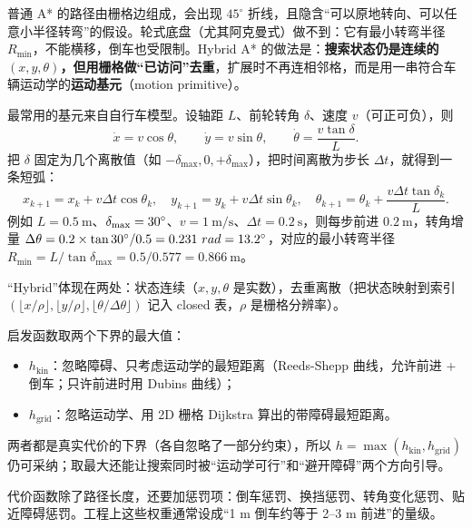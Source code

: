 普通 A* 的路径由栅格边组成，会出现 $45^\circ$ 折线，且隐含“可以原地转向、可以任意小半径转弯”的假设。轮式底盘（尤其阿克曼式）做不到：它有最小转弯半径 $R_{\min}$，不能横移，倒车也受限制。Hybrid A*\cite{dolgov2010hybridastar} 的做法是：\textbf{搜索状态仍是连续的 $(x,y,\theta)$，但用栅格做“已访问”去重}，扩展时不再连相邻格，而是用一串符合车辆运动学的\textbf{运动基元}（motion primitive）。

最常用的基元来自自行车模型。设轴距 $L$、前轮转角 $\delta$、速度 $v$（可正可负），则
\begin{equation}
  \dot x=v\cos\theta,\qquad \dot y=v\sin\theta,\qquad \dot\theta=\frac{v\tan\delta}{L}.
  \label{eq:19-bicycle}
\end{equation}
把 $\delta$ 固定为几个离散值（如 $-\delta_{\max},0,+\delta_{\max}$），把时间离散为步长 $\Delta t$，就得到一条短弧：
\begin{equation}
  x_{k+1}=x_k+v\Delta t\cos\theta_k,\quad
  y_{k+1}=y_k+v\Delta t\sin\theta_k,\quad
  \theta_{k+1}=\theta_k+\frac{v\Delta t\tan\delta_k}{L}.
\end{equation}
例如 $L=0.5\ \mathrm{m}$、$\delta_{\max}=30^\circ$、$v=1\ \mathrm{m/s}$、$\Delta t=0.2\ \mathrm{s}$，则每步前进 $0.2\ \mathrm{m}$，转角增量 $\Delta\theta=0.2\times\tan30\degree/0.5=0.231\ \mathrm{rad}=13.2\degree$，对应的最小转弯半径 $R_{\min}=L/\tan\delta_{\max}=0.5/0.577=0.866\ \mathrm{m}$。

“Hybrid”体现在两处：状态连续（$x,y,\theta$ 是实数），去重离散（把状态映射到索引 $(\lfloor x/\rho\rfloor,\lfloor y/\rho\rfloor,\lfloor\theta/\Delta\theta\rfloor)$ 记入 closed 表，$\rho$ 是栅格分辨率）。

启发函数取两个下界的最大值：
\begin{itemize}
  \item $h_{\mathrm{kin}}$：忽略障碍、只考虑运动学的最短距离（Reeds-Shepp 曲线，允许前进 + 倒车；只许前进时用 Dubins 曲线）；
  \item $h_{\mathrm{grid}}$：忽略运动学、用 2D 栅格 Dijkstra 算出的带障碍最短距离。
\end{itemize}
两者都是真实代价的下界（各自忽略了一部分约束），所以 $h=\max(h_{\mathrm{kin}},h_{\mathrm{grid}})$ 仍可采纳；取最大还能让搜索同时被“运动学可行”和“避开障碍”两个方向引导。

代价函数除了路径长度，还要加惩罚项：倒车惩罚、换挡惩罚、转角变化惩罚、贴近障碍惩罚。工程上这些权重通常设成“1 m 倒车约等于 2--3 m 前进”的量级。

